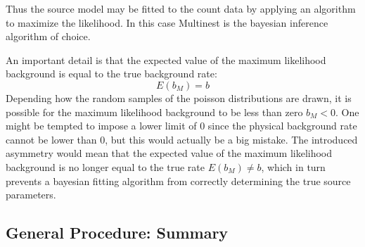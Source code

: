 \documentclass{report}
\begin{document}
Thus the source model may be fitted to the count data by applying an algorithm to maximize the likelihood. In this case Multinest \cite{Feroz_2019} is the bayesian inference algorithm of choice.

An important detail is that the expected value of the maximum likelihood background is equal to the true background rate:
\begin{equation}
  E(b_M) = b
\end{equation}
Depending how the random samples of the poisson distributions are drawn, it is possible for the maximum likelihood background to be less than zero $b_M<0$. One might be tempted to impose a lower limit of 0 since the physical background rate cannot be lower than 0, but this would actually be a big mistake. The introduced asymmetry would mean that the expected value of the maximum likelihood background is no longer equal to the true rate $E(b_M) \neq b$, which in turn prevents a bayesian fitting algorithm from correctly determining the true source parameters.


\subsection{General Procedure: Summary}
\end{document}
